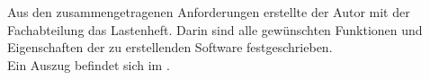 Aus den zusammengetragenen Anforderungen erstellte der Autor mit der Fachabteilung das Lastenheft. 
Darin sind alle gewünschten Funktionen und Eigenschaften der zu erstellenden 
Software festgeschrieben.\\
Ein Auszug befindet sich im .